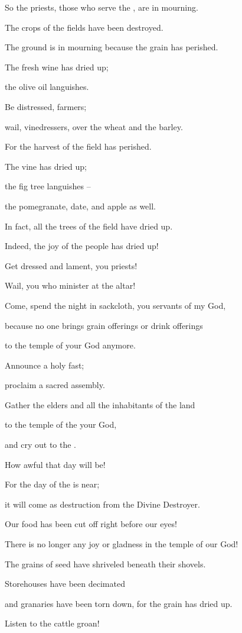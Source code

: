 {\par }{\Q So the priests,
those who serve
the {},
are in mourning.
\par }{\Q {}The crops of the fields
have been destroyed.
\par }{\Q The ground
is in mourning
because
the grain
has perished.
\par }{\Q The fresh wine
has dried up;
\par }{\Q the olive oil
languishes.
\par }{\Q {}Be distressed,
farmers;
\par }{\Q wail,
vinedressers,
over
the wheat
and the barley.
\par }{\Q For
the harvest
of the field
has perished.
\par }{\Q {}The vine
has dried up;
\par }{\Q the fig tree
languishes
–
\par }{\Q the pomegranate,
date,
and apple
as well.
\par }{\Q In fact, all
the trees
of the field
have dried up.
\par }{\Q Indeed,
the joy
of the people
has dried up!
\par }{\Q {}Get dressed
and lament,
you priests!
\par }{\Q Wail,
you who minister
at the altar!
\par }{\Q Come,
spend
the night in sackcloth,
you servants
of my God,
\par }{\Q because
no one brings
grain offerings
or drink offerings
\par }{\Q to the temple
of your God
anymore.
\par }{\Q {}Announce a holy
fast;
\par }{\Q proclaim
a sacred assembly.
\par }{\Q Gather
the elders
and all
the inhabitants
of the land
\par }{\Q to the temple
of the {}
your God,
\par }{\Q and cry out
to
the {}.
\par }{\Q {}How awful
that day
will be!

\par }{\Q For
the day
of the {}
is near;
\par }{\Q it will come as destruction
from the Divine
Destroyer.
\par }{\Q {}Our food
has been cut off
right before
our eyes!

\par }{\Q There is no
longer any joy
or gladness
in the temple
of our God!
\par }{\Q {}The grains
of seed
have shriveled beneath
their shovels.
\par }{\Q Storehouses
have been decimated
\par }{\Q and granaries
have been torn down, for
the grain
has dried up.
\par }{\Q {}Listen to the cattle
groan!


}
